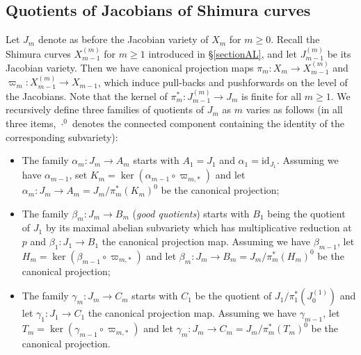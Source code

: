 \documentclass[a4paper,11pt]{amsart}
\numberwithin{equation}{section}
\theoremstyle{plain}
\theoremstyle{definition}
\theoremstyle{remark}
\begin{document}
\subsection{Quotients of Jacobians of Shimura curves} 
Let $J_m$ denote as before the Jacobian variety of $X_m$ for $m\geq 0$. Recall the Shimura curves 
${X}_{m-1}^{(m)}$ for $m\geq 1$ introduced in \S\ref{sectionAL}, and let ${J}_{m-1}^{(m)}$ be its Jacobian variety. 
Then we have canonical projection maps $\pi_m\colon X_m\rightarrow X_{m-1}^{(m)}$ and $\varpi_m\colon X_{m-1}^{(m)}\rightarrow X_{m-1}$, which induce pull-backs and pushforwards on the level of the Jacobians. Note that the kernel of $\pi_m^*\colon J_{m-1}^{(m)}\rightarrow J_m$ is finite for all $m\geq 1$. We recursively define three families of quotients of $J_m$ as $m$ varies as follows (in all three items, $\cdot^0$ denotes the connected component containing the identity of the corresponding subvariety):
\begin{itemize}
\item The family $\alpha_m\colon J_m\to A_m$ starts with $A_1=J_1$ and $\alpha_1=\mathrm{id}_{J_1}$. Assuming we have $\alpha_{m-1}$, set $K_m=\ker(\alpha_{m-1}\circ\varpi_{m,*})$ and let $\alpha_m\colon J_m\rightarrow A_m=J_m/\pi_m^*(K_m)^0$ be the canonical projection;

\item The family $\beta_m\colon J_m\to B_m$ (\emph{good quotients}) starts with $B_1$ being the quotient of $J_1$ by its maximal abelian subvariety which has multiplicative reduction at $p$ and $\beta_1\colon J_1\rightarrow B_1$ the canonical projection map. Assuming we have $\beta_{m-1}$, let $H_m=\ker(\beta_{m-1}\circ\varpi_{m,*})$ and let $\beta_m\colon J_m\rightarrow 
B_m=J_m/\pi_m^*(H_m)^0$ be the canonical projection;

\item The family $\gamma_m\colon J_m\to C_m$ starts with $C_1$ be the quotient of $J_1/\pi_1^*(J^{(1)}_0)$ and let $\gamma_1\colon J_1\rightarrow C_1$ the canonical projection map. Assuming we have $\gamma_{m-1}$, let $T_m=\ker(\gamma_{m-1}\circ\varpi_{m,*})$ and let $\gamma_m\colon J_m\rightarrow 
C_m=J_m/\pi_m^*(T_m)^0$ be the canonical projection.
\end{itemize}
\end{document}
